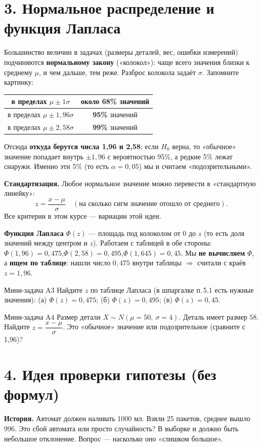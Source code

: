 \documentclass[a4paper,11pt]{extarticle}
\begin{document}
\section*{3. Нормальное распределение и функция Лапласа}
Большинство величин в задачах (размеры деталей, вес, ошибки измерений) подчиняются \textbf{нормальному закону} («колокол»): чаще всего значения близки к среднему $\mu$, и чем дальше, тем реже. Разброс колокола задаёт $\sigma$. Запомните картинку:
\begin{center}
\begin{tabular}{|c|c|}\hline
в пределах $\mu\pm1\sigma$ & около 68\% значений\\\hline
в пределах $\mu\pm1{,}96\sigma$ & \textbf{95\%} значений\\\hline
в пределах $\mu\pm2{,}58\sigma$ & \textbf{99\%} значений\\\hline
\end{tabular}
\end{center}
Отсюда \textbf{откуда берутся числа 1,96 и 2,58}: если $H_0$ верна, то «обычное» значение попадает внутрь $\pm1{,}96$ с вероятностью 95\%, а редкие 5\% лежат снаружи. Именно эти 5\% (то есть $\alpha=0{,}05$) мы и считаем «подозрительными».

\textbf{Стандартизация.} Любое нормальное значение можно перевести в «стандартную линейку»:
$$z=\frac{x-\mu}{\sigma}\quad(\text{на сколько сигм значение отошло от среднего}).$$
Все критерии в этом курсе --- вариации этой идеи.

\textbf{Функция Лапласа} $\Phi(z)$ --- площадь под колоколом от 0 до $z$ (то есть доля значений между центром и $z$). Работаем с таблицей в обе стороны: \quad $\Phi(1{,}96)=0{,}475$,\quad $\Phi(2{,}58)=0{,}495$,\quad $\Phi(1{,}645)=0{,}45$. Мы \textbf{не вычисляем} $\Phi$, а \textbf{ищем по таблице}: нашли число $0{,}475$ внутри таблицы $\Rightarrow$ считали с краёв $z=1{,}96$.

\begin{task}{Мини-задача A3}
Найдите $z$ по таблице Лапласа (в шпаргалке п.\,5.1 есть нужные значения): (а) $\Phi(z)=0{,}475$; (б) $\Phi(z)=0{,}495$; (в) $\Phi(z)=0{,}45$.
\end{task}
\begin{task}{Мини-задача A4}
Размер детали $X\sim N(\mu=50,\ \sigma=4)$. Деталь имеет размер $58$. Найдите $z=\dfrac{x-\mu}{\sigma}$. Это «обычное» значение или подозрительное (сравните с 1,96)?
\end{task}

\section*{4. Идея проверки гипотезы (без формул)}
\textbf{История.} Автомат должен наливать 1000 мл. Взяли 25 пакетов, среднее вышло 996. Это сбой автомата или просто случайность? В выборке и должно быть небольшое отклонение. Вопрос --- насколько оно «слишком большое».
\end{document}
